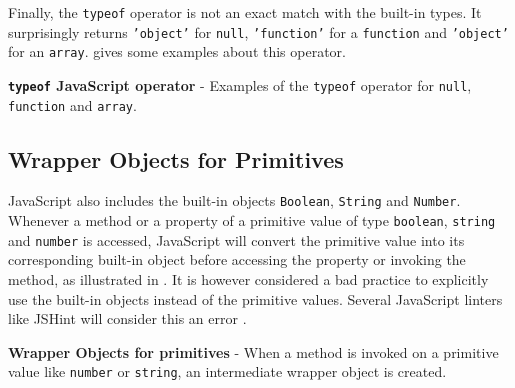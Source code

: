 Finally, the \texttt{typeof} operator is not an exact match with the built-in types. It surprisingly returns \texttt{'object'} for \texttt{null}, \texttt{'function'} for a \texttt{function} and \texttt{'object'} for an \texttt{array}.  gives some examples about this operator.

\begin{code}
	\captionsetup{aboveskip=0pt, belowskip=10pt}
	\caption[typeof JavaScript operator]{\textbf{\texttt{typeof} JavaScript operator} - Examples of the \texttt{typeof} operator for \texttt{null}, \texttt{function} and \texttt{array}.}
	\label{code:background-javascript-typeof}
\end{code}

\subsection{Wrapper Objects for Primitives}
JavaScript also includes the built-in objects \texttt{Boolean}, \texttt{String} and \texttt{Number}. Whenever a method or a property of a primitive value of type \texttt{boolean}, \texttt{string} and \texttt{number} is accessed, JavaScript will convert the primitive value into its corresponding built-in object before accessing the property or invoking the method, as illustrated in . It is however considered a bad practice to explicitly use the built-in objects instead of the primitive values. Several JavaScript linters like JSHint will consider this an error \citep{jshint-wrapper-objects-error}.

\begin{code}
	\captionsetup{aboveskip=0pt, belowskip=10pt}
	\caption[Wrapper Objects for primitives]{\textbf{Wrapper Objects for primitives} - When a method is invoked on a primitive value like \texttt{number} or \texttt{string}, an intermediate wrapper object is created.}
	\label{code:background-javascript-wrapper-objects}
\end{code}

